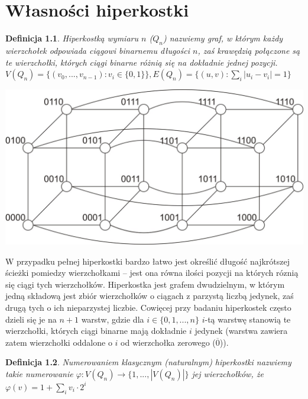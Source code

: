 \documentclass{pracamgr}
\newtheorem{defi}{Definicja}[section]
\begin{document}
 \chapter{Własności hiperkostki}
  \begin{defi}\label{hiperkostka}
   \emph{Hiperkostką wymiaru $n$ ($Q_n$)} nazwiemy graf, w którym każdy wierzchołek odpowiada ciągowi binarnemu długości $n$,
   zaś krawędzią połączone są te wierzchołki, których ciągi binarne różnią się na dokładnie jednej pozycji.\newline
   $V(Q_n)=\{(v_0,...,v_{n-1}):v_i\in\{0,1\}\}, E(Q_n)=\{(u,v):\sum_{i}|u_i-v_i|=1\}$
  \end{defi}
  \begin{center}
   \includegraphics[scale=0.6]{Q_4.jpg}
  \end{center}
  W przypadku pełnej hiperkostki %
  bardzo łatwo jest określić długość najkrótszej ścieżki pomiedzy wierzchołkami --
  jest ona równa ilości pozycji na których róznią się ciągi tych wierzchołków.\newline
  Hiperkostka jest grafem dwudzielnym, w którym jedną składową jest zbiór wierzchołków o ciągach z parzystą liczbą jedynek,
  zaś drugą tych o ich nieparzystej liczbie.\newline
  Cowięcej przy badaniu hiperkostek często dzieli się je na $n+1$ warstw, gdzie dla $i\in\{0,1,...,n\}$ $i$-tą warstwę stanowią te wierzchołki,
  których ciągi binarne mają dokładnie $i$ jedynek (warstwa zawiera zatem wierzchołki oddalone o $i$ od wierzchołka zerowego ($\overline{0}$)).
  \begin{defi}\label{numerowanie klasyczne}
   \emph{Numerowaniem klasycznym (naturalnym)} hiperkostki nazwiemy takie numerowanie $\varphi:V(Q_n)\rightarrow\{1,...,|V(Q_n)|\}$ jej wierzchołków, że
   $\varphi(v)=1+\sum_{i}v_i\cdot2^i$
  \end{defi}
\end{document}
